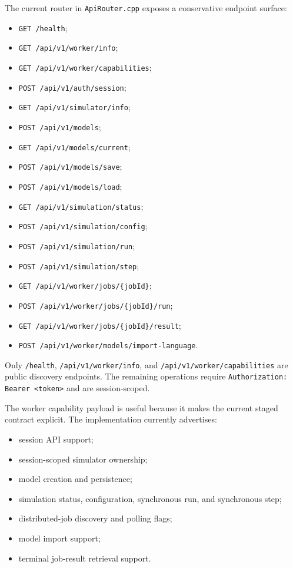 The current router in \texttt{ApiRouter.cpp} exposes a conservative endpoint
surface:
\begin{itemize}
\item \texttt{GET /health};
\item \texttt{GET /api/v1/worker/info};
\item \texttt{GET /api/v1/worker/capabilities};
\item \texttt{POST /api/v1/auth/session};
\item \texttt{GET /api/v1/simulator/info};
\item \texttt{POST /api/v1/models};
\item \texttt{GET /api/v1/models/current};
\item \texttt{POST /api/v1/models/save};
\item \texttt{POST /api/v1/models/load};
\item \texttt{GET /api/v1/simulation/status};
\item \texttt{POST /api/v1/simulation/config};
\item \texttt{POST /api/v1/simulation/run};
\item \texttt{POST /api/v1/simulation/step};
\item \texttt{GET /api/v1/worker/jobs/\{jobId\}};
\item \texttt{POST /api/v1/worker/jobs/\{jobId\}/run};
\item \texttt{GET /api/v1/worker/jobs/\{jobId\}/result};
\item \texttt{POST /api/v1/worker/models/import-language}.
\end{itemize}

Only \texttt{/health}, \texttt{/api/v1/worker/info}, and
\texttt{/api/v1/worker/capabilities} are public discovery endpoints. The
remaining operations require \texttt{Authorization: Bearer <token>} and are
session-scoped.

The worker capability payload is useful because it makes the current staged
contract explicit. The implementation currently advertises:
\begin{itemize}
\item session API support;
\item session-scoped simulator ownership;
\item model creation and persistence;
\item simulation status, configuration, synchronous run, and synchronous step;
\item distributed-job discovery and polling flags;
\item model import support;
\item terminal job-result retrieval support.
\end{itemize}


